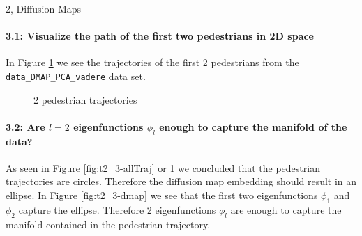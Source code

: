 \begin{task}{2, Diffusion Maps}
\paragraph{3.1: Visualize the path of the first two pedestrians in 2D space}
In Figure \ref{fig:t2_3-pedTraj} we see the trajectories of the first 2 pedestrians from the \verb|data_DMAP_PCA_vadere| data set.
\begin{figure}[H]
\centering
{}
\caption{2 pedestrian trajectories}
\label{fig:t2_3-pedTraj}
\end{figure}

\paragraph{3.2: Are $l=2$ eigenfunctions $\phi_l$ enough to capture the manifold of the data?}
As seen in Figure \ref{fig:t2_3-allTraj} or \ref{fig:t2_3-pedTraj} we concluded that the pedestrian trajectories are circles. Therefore the diffusion map embedding should result in an ellipse. In Figure \ref{fig:t2_3-dmap} we see that the first two eigenfunctions $\phi_1$ and $\phi_2$ capture the ellipse. Therefore 2 eigenfunctions $\phi_l$ are enough to capture the manifold contained in the pedestrian trajectory.


\end{task}
